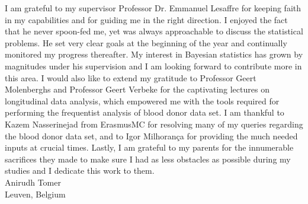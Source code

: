 I am grateful to my supervisor Professor Dr. Emmanuel Lesaffre for keeping faith in my capabilities and for guiding me in the right direction. I enjoyed the fact that he never spoon-fed me, yet was always approachable to discuss the statistical problems. He set very clear goals at the beginning of the year and continually monitored my progress thereafter. My interest in Bayesian statistics has grown by magnitudes under his supervision and I am looking forward to contribute more in this area. I would also like to extend my gratitude to Professor Geert Molenberghs and Professor Geert Verbeke for the captivating lectures on longitudinal data analysis, which empowered me with the tools required for performing the frequentist analysis of blood donor data set. I am thankful to Kazem Nasserinejad from ErasmusMC for resolving many of my queries regarding the blood donor data set, and to Igor Milhorança for providing the much needed inputs at crucial times. Lastly, I am grateful to my parents for the innumerable sacrifices they made to make sure I had as less obstacles as possible during my studies and I dedicate this work to them.\\

Anirudh Tomer\\
Leuven, Belgium